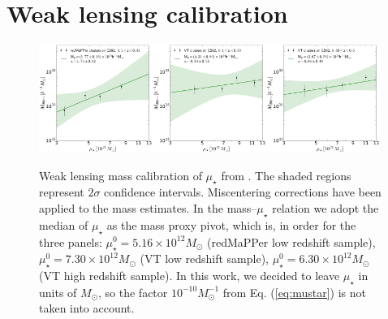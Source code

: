 \section{Weak lensing calibration}\label{wlcalib}


\begin{figure}
\includegraphics[width=0.33\textwidth]{./chapters/chapter5/figs/mass_richness_lowz_mustar_MEpivotMedianMiscV2.pdf}\includegraphics[width=0.33\textwidth]{./chapters/chapter5/figs/mass_richness_VT_lowz_mustar_MEpivotMedianMiscV2.pdf}\includegraphics[width=0.33\textwidth]{./chapters/chapter5/figs/mass_richness_VT_midz_mustar_MEpivotMedianMiscV2.pdf}\caption{Weak lensing mass calibration of $\mu_\star$ from \citet{maria}. The shaded regions represent $2\sigma$ confidence intervals. Miscentering corrections have been applied to the mass estimates. In the mass--$\mu_{\star}$ relation we adopt the median of $\mu_{\star}$ as the mass proxy pivot, which is, in order for the three panels: $\mu_{\star}^0 = 5.16 \times 10^{12} M_{\odot}$ (redMaPPer low redshift sample), $\mu_{\star}^0 = 7.30 \times 10^{12} M_{\odot}$ (VT low redshift sample), $\mu_{\star}^0 = 6.30 \times 10^{12} M_{\odot}$(VT high redshift sample). In this work, we decided to leave $\mu_\star$ in units of $M_\odot$, so the factor $10^{-10} M_\odot^{-1}$ from Eq. (\ref{eq:mustar}) is not taken into account.}\label{fig:wlcalib}
\end{figure}

